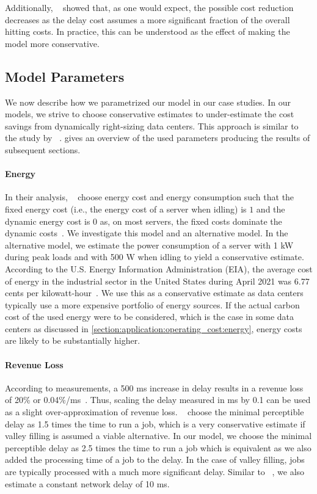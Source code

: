 Additionally, \citeauthor*{Lin2011}~\cite{Lin2011} showed that, as one would expect, the possible cost reduction decreases as the delay cost assumes a more significant fraction of the overall hitting costs. In practice, this can be understood as the effect of making the model more conservative.

\subsection{Model Parameters}

We now describe how we parametrized our model in our case studies. In our models, we strive to choose conservative estimates to under-estimate the cost savings from dynamically right-sizing data centers. This approach is similar to the study by \citeauthor*{Lin2011}~\cite{Lin2011}.  gives an overview of the used parameters producing the results of subsequent sections.

\paragraph{Energy} In their analysis, \citeauthor*{Lin2011}~\cite{Lin2011} choose energy cost and energy consumption such that the fixed energy cost (i.e., the energy cost of a server when idling) is $1$ and the dynamic energy cost is $0$ as, on most servers, the fixed costs dominate the dynamic costs~\cite{Clark2005}. We investigate this model and an alternative model. In the alternative model, we estimate the power consumption of a server with 1 kW during peak loads and with 500 W when idling to yield a conservative estimate. According to the U.S. Energy Information Administration (EIA), the average cost of energy in the industrial sector in the United States during April 2021 was 6.77 cents per kilowatt-hour~\cite{EIA2021}. We use this as a conservative estimate as data centers typically use a more expensive portfolio of energy sources. If the actual carbon cost of the used energy were to be considered, which is the case in some data centers as discussed in \cref{section:application:operating_cost:energy}, energy costs are likely to be substantially higher.

\paragraph{Revenue Loss} According to measurements, a 500 ms increase in delay results in a revenue loss of 20\% or 0.04\%/ms~\cite{Lin2012, Hamilton2009}. Thus, scaling the delay measured in ms by 0.1 can be used as a slight over-approximation of revenue loss. \citeauthor*{Lin2011}~\cite{Lin2011} choose the minimal perceptible delay as 1.5 times the time to run a job, which is a very conservative estimate if valley filling is assumed a viable alternative. In our model, we choose the minimal perceptible delay as 2.5 times the time to run a job which is equivalent as we also added the processing time of a job to the delay. In the case of valley filling, jobs are typically processed with a much more significant delay. Similar to \citeauthor*{Lin2012}~\cite{Lin2012}, we also estimate a constant network delay of 10 ms.

